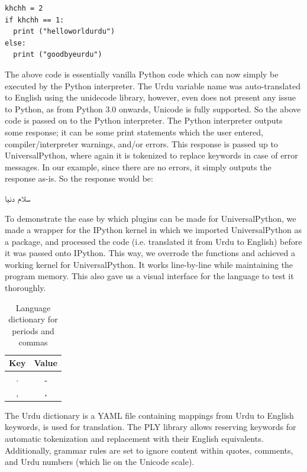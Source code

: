 \documentclass[conference]{IEEEtran}
\begin{document}
\begin{lstlisting}
khchh = 2
if khchh == 1:
  print ("helloworldurdu")
else:
  print ("goodbyeurdu")
\end{lstlisting}

The above code is essentially vanilla Python code which can now simply be executed by the Python interpreter. The Urdu variable name was auto-translated to English using the unidecode library, however, even  does not present any issue to Python, as from Python 3.0 onwards, Unicode is fully supported. So the above code is passed on to the Python interpreter. The Python interpreter outputs some response; it can be some print statements which the user entered, compiler/interpreter warnings, and/or errors. This response is passed up to UniversalPython, where again it is tokenized to replace keywords in case of error messages. In our example, since there are no errors, it simply outputs the response as-is. So the response would be:

\begin{urdu} %
\urdufont 
سلام دنیا

\end{urdu} %
  

To demonstrate the ease by which plugins can be made for UniversalPython, we made a wrapper for the IPython kernel in which we imported UniversalPython as a package, and processed the code (i.e. translated it from Urdu to English) before it was passed onto IPython. This way, we overrode the functions and achieved a working kernel for UniversalPython. It works line-by-line while maintaining the program memory. This also gave us a visual interface for the language to test it thoroughly.

\begin{table}[h]
    \centering
    \caption{Language dictionary for periods and commas}
    \label{tab:language_dictionary}
    \begin{tabular}{cc}
    \hline
    Key & Value \\
    \hline
    . & \texturdu{۔} \\
    , & \texturdu{،} \\
    \hline
    \end{tabular}
    \end{table}

The Urdu dictionary is a YAML file containing mappings from Urdu to English keywords, is used for translation. The PLY library allows reserving keywords for automatic tokenization and replacement with their English equivalents. Additionally, grammar rules are set to ignore content within quotes, comments, and Urdu numbers (which lie on the Unicode scale).
\end{document}
